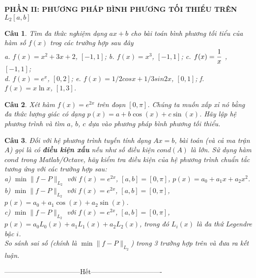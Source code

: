\documentclass[11pt]{article}
\newtheorem{bt}{Câu}
\begin{document}
\begin{center}	
	\textbf{PHẦN II: PHƯƠNG PHÁP BÌNH PHƯƠNG TỐI THIỂU TRÊN $L_2[a,b]$}
\end{center}


\begin{bt}
	Tìm đa thức nghiệm dạng $ax+b$ cho bài toán bình phương tối tiểu của hàm số $f(x)$ trog các trường hợp sau đây \\
	a. $f(x) = x^2 + 3x + 2$, $[-1,1]$; \qquad b. $f(x) = x^3$, $[-1, 1]$; \qquad c. $f(x) = \cfrac{1}{x}$\ , $[-1, 1]$; \\
	d. $f(x) = e^x$, $[0, 2]$; \qquad e. $f(x) = 1/2 cos x + 1/3 sin 2x$, $[0, 1]$; \qquad f. $f(x) = x \ln x$, $[1, 3]$.
\end{bt}

\begin{bt}
Xét hàm $f(x) = e^{2x}$ trên đoạn $[0, \pi]$. Chúng ta muốn xấp xỉ nó bằng đa thức lượng giác có dạng $p(x) = a + b \cos(x) + c \sin(x)$. Hãy lập hệ phương trình và tìm $a$, $b$, $c$ dựa vào phương pháp bình phương tối thiểu.
\end{bt}

\begin{bt} Đối với hệ phương trình tuyến tính dạng $Ax=b$, bài toán (và cả ma trận $A$) gọi là có \textbf{điều kiện xấu} nếu như số điều kiện $cond(A)$ là lớn. Sử dụng hàm $cond$ trong Matlab/Octave, hãy kiểm tra điều kiện của hệ phương trình chuẩn tắc tương ứng với các trường hợp sau:\\
a) $\min \|f-P\|_{L_2}$ với $f(x)=e^{2x}$, $[a,b]=[0,\pi]$, $p(x)=a_0 + a_1 x + a_2 x^2 $.	 \\
b) $\min \|f-P\|_{L_2}$ với $f(x)=e^{2x}$, $[a,b]=[0,\pi]$, $p(x)=a_0 + a_1 \cos(x) + a_2 \sin(x) $. \\
c) $\min \|f-P\|_{L_2}$ với $f(x)=e^{2x}$, $[a,b]=[0,\pi]$, $p(x)=a_0 L_0(x) + a_1 L_1(x) + a_2 L_2(x)$, trong đó $L_i(x)$ là đa thứ Legendre bậc $i$.\\
So sánh sai số (chính là $\min \|f-P\|_{L_2}$) trong 3 trường hợp trên và đưa ra kết luận.
\end{bt}


\centerline{———————————Hết——————————-}
\end{document}
